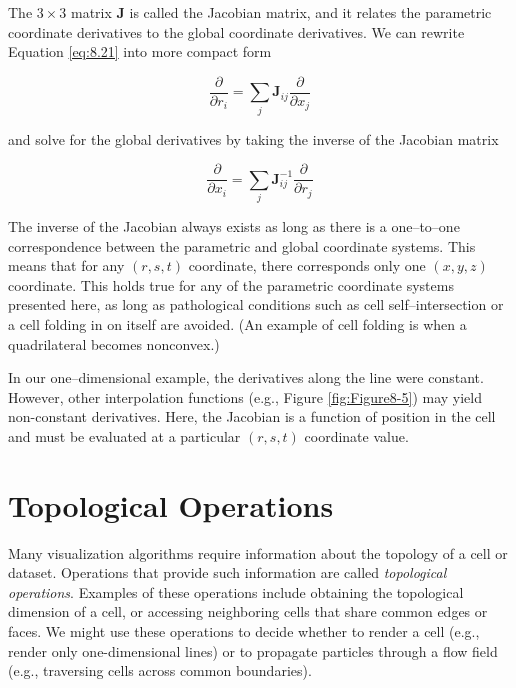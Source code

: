 The $3 \times 3$ matrix $\mathbf{J}$ is called the Jacobian matrix, and it relates the parametric coordinate derivatives to the global coordinate derivatives. We can rewrite Equation \ref{eq:8.21} into more compact form

\begin{equation}\label{eq:8.22}
\dfrac{\partial}{\partial r_i} = \sum_{j} \mathbf{J}_{ij} \dfrac{\partial}{\partial x_j}
\end{equation}

and solve for the global derivatives by taking the inverse of the Jacobian matrix

\begin{equation}\label{eq:8.23}
\frac{\partial}{\partial x_i} = \sum_{j} \mathbf{J}_{ij}^{-1} \frac{\partial}{\partial r_j}
\end{equation}

The inverse of the Jacobian always exists as long as there is a one--to--one correspondence between the parametric and global coordinate systems. This means that for any $(r, s, t)$ coordinate, there corresponds only one $(x, y, z)$ coordinate. This holds true for any of the parametric coordinate systems presented here, as long as pathological conditions such as cell self--intersection or a cell folding in on itself are avoided. (An example of cell folding is when a quadrilateral becomes nonconvex.)

In our one--dimensional example, the derivatives along the line were constant. However, other interpolation functions (e.g., Figure \ref{fig:Figure8-5}) may yield non-constant derivatives. Here, the Jacobian is a function of position in the cell and must be evaluated at a particular $(r, s, t)$ coordinate value.

\section{Topological Operations}

Many visualization algorithms require information about the topology of a cell or dataset. Operations that provide such information are called \emph{topological operations}. Examples of these operations include obtaining the topological dimension of a cell, or accessing neighboring cells that share common edges or faces. We might use these operations to decide whether to render a cell (e.g., render only one-dimensional lines) or to propagate particles through a flow field (e.g., traversing cells across common boundaries).

